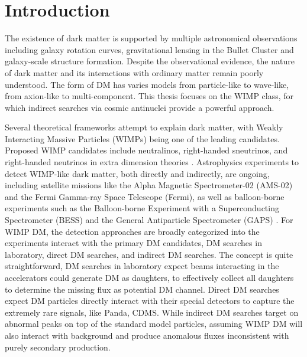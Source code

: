 
\chapter{Introduction}
\label{chap:intro}

The existence of dark matter is supported by multiple astronomical observations including galaxy rotation curves, gravitational lensing in the Bullet Cluster \cite{10.1046/j.1365-8711.2000.03075.x} and galaxy-scale structure formation. Despite the observational evidence, the nature of dark matter and its interactions with ordinary matter remain poorly understood. The form of \ac{DM} has varies models from particle-like to wave-like, from axion-like to multi-component. This thesis focuses on the WIMP class, for which indirect searches via cosmic antinuclei provide a powerful approach.

Several theoretical frameworks attempt to explain dark matter, with Weakly Interacting Massive Particles (WIMPs) being one of the leading candidates. Proposed WIMP candidates include neutralinos, right-handed sneutrinos, and right-handed neutrinos in extra dimension theories \cite{donato2000antideuterons, donato2008antideuteron,cerdeno2009right, cerdeno2014low,baer2005low}. Astrophysics experiments to detect \ac{WIMP}-like dark matter, both directly and indirectly, are ongoing, including satellite missions like the Alpha Magnetic Spectrometer-02 (AMS-02) and the Fermi Gamma-ray Space Telescope (Fermi), as well as balloon-borne experiments such as the Balloon-borne Experiment with a Superconducting Spectrometer (BESS) and the General Antiparticle Spectrometer (GAPS) \cite{aguilar2002alpha, lubelsmeyer2011upgrade, ajima2000superconducting, hailey2006accelerator}. For \ac{WIMP} \ac{DM}, the detection approaches are broadly categorized into the experiments interact with the primary \ac{DM} candidates, \ac{DM} searches in laboratory, direct \ac{DM} searches, and indirect \ac{DM} searches. The concept is quite straightforward, \ac{DM} searches in laboratory expect beams interacting in the accelerators could generate \ac{DM} as daughters, to effectively collect all daughters to determine the missing flux as potential \ac{DM} channel. Direct \ac{DM} searches expect \ac{DM} particles directly interact with their special detectors to capture the extremely rare signals, like Panda, CDMS. While indirect \ac{DM} searches target on abnormal peaks on top of the standard model particles, assuming \ac{WIMP} \ac{DM} will also interact with background and produce anomalous fluxes inconsistent with purely secondary production.

